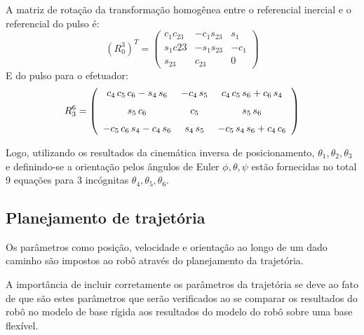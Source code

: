 A matriz de rotação da transformação homogênea entre o referencial inercial e o
referencial do pulso é:
%
\begin{equation}
	(R_0^3)^T = 
\begin{pmatrix}
c_1 c_{23} & -c_1 s_{23}  & s_1 \\ 
s_1 c{23} & -s_1 s_{23}  & -c_1 \\ 
s_{23} & c_{23}  & 0 
\end{pmatrix}
\end{equation}
%
E do pulso para o efetuador:
%
\begin{equation}
R_3^6 = 
\left( \begin {array}{ccc} { c_4}\,{ c_5}\,{ c_6}-{ s_4}\,{
 s_6}&-{ c_4}\,{ s_5}&{ c_4}\,{ c_5}\,{ s_6}+{ c_6}\,{
 s_4}\\ \noalign{\medskip}{ s_5}\,{ c_6}&{ c_5}&{ s_5}\,{
 s_6}\\ \noalign{\medskip}-{ c_5}\,{ c_6}\,{ s_4}-{ c_4}\,{
 s_6}&{ s_4}\,{ s_5}&-{ c_5}\,{ s_4}\,{ s_6}+{ c_4}\,{
 c_6}\end {array} \right)
\end{equation}
%

Logo, utilizando os resultados da cinemática inversa de posicionamento,
$\theta_1, \theta_2, \theta_3$ e definindo-se a orientação pelos ângulos de
Euler $\phi, \theta, \psi$ estão fornecidas no total 9 equações para 3
incógnitas $\theta_4, \theta_5, \theta_6$. 

\subsection{ Planejamento de trajetória} \label{sec::plan_traj}











Os parâmetros como posição, velocidade e orientação ao longo de um dado caminho
são impostos ao robô através do planejamento da trajetória.


A importância de incluir corretamente os parâmetros da trajetória se
deve ao fato de que são estes parâmetros que serão verificados ao se comparar
os resultados do robô no modelo de base rígida aos resultados do modelo do robô
sobre uma base flexível. 


